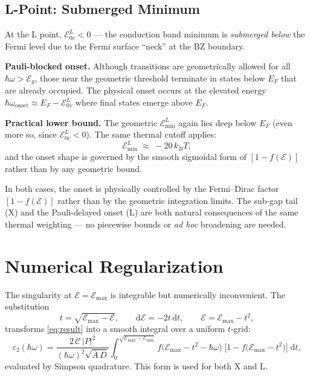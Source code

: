 \documentclass[11pt, a4paper]{article}
\newcommand{\E}{\mathcal{E}}
\newcommand{\Eoc}{\E_{0c}}
\newcommand{\Eov}{\E_{0v}}
\newcommand{\Eg}{\E_g}
\newcommand{\Emax}{\E_{\max}}
\newcommand{\Emin}{\E_{\min}}
\newcommand{\Abar}{\bar{A}}
\newcommand{\hw}{\hbar\omega}
\newcommand{\dd}{\mathrm{d}}
\begin{document}
\begin{minipage}[t]{0.47\textwidth}
\vspace{0pt}
\subsection*{L-Point: Submerged Minimum}

At the L point, $\Eoc^L < 0$ --- the conduction band minimum is \emph{submerged below} the Fermi level due to the Fermi surface ``neck'' at the BZ boundary.

\textbf{Pauli-blocked onset.} Although transitions are geometrically allowed for all $\hw > \Eg$, those near the geometric threshold terminate in states below $E_F$ that are already occupied. The physical onset occurs at the elevated energy $\hw_{\mathrm{onset}} \approx E_F - \Eov^L$ where final states emerge above $E_F$.

\textbf{Practical lower bound.} The geometric $\Emin^L$ again lies deep below $E_F$ (even more so, since $\Eoc^L < 0$). The same thermal cutoff applies:
\begin{equation*}
    \Emin^L \;\approx\; -20\,k_BT,
\end{equation*}
and the onset shape is governed by the smooth sigmoidal form of $[1 - f(\E)]$ rather than by any geometric bound.
\end{minipage}

\vspace{0.8cm}

In both cases, the onset is physically controlled by the Fermi--Dirac factor $[1 - f(\E)]$ rather than by the geometric integration limits. The sub-gap tail (X) and the Pauli-delayed onset (L) are both natural consequences of the same thermal weighting --- no piecewise bounds or \textit{ad hoc} broadening are needed.

\section{Numerical Regularization}

The singularity at $\E = \Emax$ is integrable but numerically inconvenient. The substitution
\begin{equation}
    t = \sqrt{\Emax - \E}, \qquad \dd\E = -2t\,\dd t, \qquad \E = \Emax - t^2,
\end{equation}
transforms \eqref{eq:result} into a smooth integral over a uniform $t$-grid:
\begin{equation}\label{eq:regularized}
    \boxed{\;
    \varepsilon_2(\hw)
    = \frac{2\,\mathcal{C}\,|P|^2}{(\hw)^2\sqrt{\Abar\,D}}
    \int_0^{\sqrt{\Emax - \Emin}}
    f\!\bigl(\Emax - t^2 - \hw\bigr)\;
    \bigl[1 - f\!\bigl(\Emax - t^2\bigr)\bigr]
    \;\dd t,
    \;}
\end{equation}
evaluated by Simpson quadrature. This form is used for both X and L.
\end{document}
